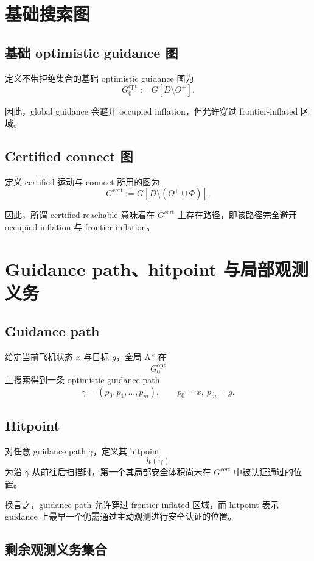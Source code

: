 \documentclass[11pt]{ctexart}
\begin{document}
\section{基础搜索图}

\subsection{基础 optimistic guidance 图}

定义不带拒绝集合的基础 optimistic guidance 图为
\[
G^{\mathrm{opt}}_0 := G[D\setminus O^{+}].
\]

因此，global guidance 会避开 occupied inflation，但允许穿过 frontier-inflated 区域。

\subsection{Certified connect 图}

定义 certified 运动与 connect 所用的图为
\[
G^{\mathrm{cert}}
:= G[D\setminus (O^{+}\cup \Phi)].
\]

因此，所谓 certified reachable 意味着在 $G^{\mathrm{cert}}$ 上存在路径，即该路径完全避开 occupied inflation 与 frontier inflation。

\section{Guidance path、hitpoint 与局部观测义务}

\subsection{Guidance path}

给定当前飞机状态 $x$ 与目标 $g$，全局 A* 在
\[
G^{\mathrm{opt}}_0
\]
上搜索得到一条 optimistic guidance path
\[
\gamma=(p_0,p_1,\dots,p_m), \qquad p_0=x,\ p_m=g.
\]

\subsection{Hitpoint}

对任意 guidance path $\gamma$，定义其 hitpoint
\[
h(\gamma)
\]
为沿 $\gamma$ 从前往后扫描时，第一个其局部安全体积尚未在 $G^{\mathrm{cert}}$ 中被认证通过的位置。

换言之，guidance path 允许穿过 frontier-inflated 区域，而 hitpoint 表示 guidance 上最早一个仍需通过主动观测进行安全认证的位置。

\subsection{剩余观测义务集合}
\end{document}
